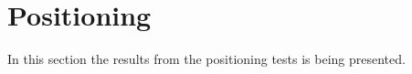 \section{Positioning}\label{sec:resultPos}
In this section the results from the positioning tests is being presented.

